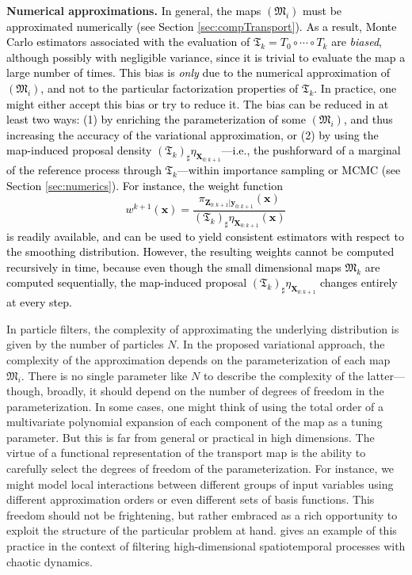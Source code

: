 \documentclass[twoside,11pt]{article}
\newcommand{\push}{_\sharp}                                      %
\newcommand{\Xb}{\boldsymbol{X}}
\newcommand{\xb}{\boldsymbol{x}}
\newcommand{\yb}{\boldsymbol{y}}
\newcommand{\Zb}{\boldsymbol{Z}}
\newcommand{\submap}{\mathfrak{M}}
\begin{document}
%
%
%
%
%
%
%
%
%
%
%
%
%
%

%
%
%
%
%
%
%
%
%
%
%
%
%
%
%
%
%
%
%
%
%
%
%
%
%
%
%
%
%
%
%
%
%
%
%
%

{\bf Numerical approximations.}
\textcolor{black}
{ 
In general, the maps $(\submap_i)$ must be approximated numerically 
(see Section \ref{sec:compTransport}).
As a result, Monte Carlo estimators
associated with the evaluation of 
$\mathfrak{T}_k = T_0 \circ \cdots \circ T_k$ are {\it biased}, although possibly with negligible variance, since it is trivial to evaluate the map a large number of times.
This bias is {\it only} due to the numerical approximation of $(\submap_i)$, and not
to the particular factorization properties of $\mathfrak{T}_k$.
In practice, one might either accept this bias or try to reduce it.
The bias can be reduced in at least two ways:
(1) by enriching the parameterization of some $(\submap_i)$, and thus 
increasing the accuracy of the
  variational approximation,
%
 or (2) by using the
map-induced proposal density $(\mathfrak{T}_k)\push \eta_{\Xb_{0:k+1}}$---i.e.,  
the pushforward of a marginal of the reference process through $\mathfrak{T}_k$---within importance sampling or MCMC (see Section \ref{sec:numerics}).
For instance, the weight function
\begin{equation}
  w^{k+1}(\xb) = \frac{\pi_{\Zb_{0:k+1} \vert \yb_{0:k+1}}(\xb)}{ (\mathfrak{T}_k)\push \eta_{\Xb_{0:k+1}}(\xb)}
\end{equation}
is readily available, and can be used to yield consistent estimators with
respect to the smoothing distribution.
However, the resulting weights cannot be computed recursively in time, because even though
the small dimensional maps $\submap_k$ are computed sequentially, the map-induced proposal
$(\mathfrak{T}_k)\push \eta_{\Xb_{0:k+1}}$
changes entirely at every step.
}

In particle filters, the complexity of approximating the underlying
distribution is given by the number of particles $N$.
In the proposed variational approach, the complexity of the
approximation depends on the parameterization of each map $\submap_i$. 
%
%
%
There is no single parameter like $N$ to describe the complexity of the latter---though, broadly, it should depend on the number of degrees of freedom in the parameterization.
%
%
In some cases, one might think of using the total order of a multivariate
polynomial expansion of each component of the map as a tuning parameter.
But this is far from general or practical in high dimensions.
The virtue of a functional representation of the transport map is the ability
to carefully select the degrees of freedom of the parameterization.
For instance, we might model local interactions between different 
groups of input variables using different approximation orders or even different 
sets of basis functions.
This freedom should {not} be frightening, but rather embraced as a
rich opportunity to exploit %
the structure
of the particular problem at hand.
\citet[Ch.~6]{spantini2017inference} %
gives an  
example of this practice in the context of filtering high-dimensional
spatiotemporal processes with chaotic dynamics.
\end{document}
